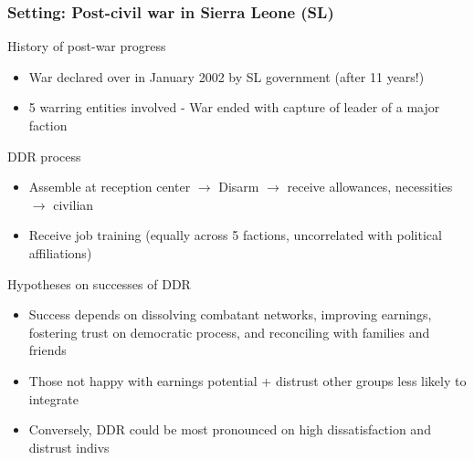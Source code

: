 \documentclass[aspectratio=169]{beamer}
\begin{document}
\begin{frame}
\frametitle{Setting: Post-civil war in Sierra Leone (SL)} 
History of post-war progress
 \begin{itemize}\setlength\itemsep{3pt}
\item War declared over in January 2002 by SL government (after 11 years!)
\item 5 warring entities involved - War ended with capture of leader of a major faction
 \end{itemize}\medskip
 DDR process 
 \begin{itemize}\setlength\itemsep{3pt}
\item Assemble at reception center $\to$ Disarm $\to$ receive allowances, necessities $\to$ civilian
\item Receive job training (equally across 5 factions, uncorrelated with political affiliations)
\end{itemize}\medskip

Hypotheses on successes of DDR
 \begin{itemize}\setlength\itemsep{3pt}
\item Success depends on dissolving combatant networks, improving earnings, fostering trust on democratic process, and reconciling with families and friends
\item Those not happy with earnings potential + distrust other groups less likely to integrate
\item Conversely, DDR could be most pronounced on high dissatisfaction and distrust indivs
\end{itemize}
\end{frame}
\end{document}
